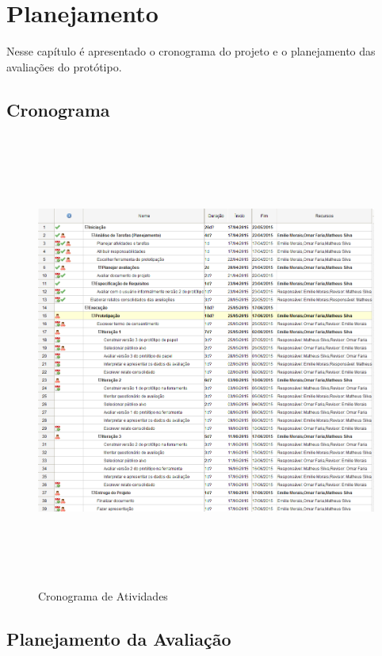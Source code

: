 \chapter{Planejamento}

Nesse capítulo é apresentado o cronograma do projeto e o planejamento das avaliações do protótipo.
\graphicspath{{figuras/}}

\section{Cronograma}
\begin{figure}[!htb]
 \centering
 \includegraphics[width = 17.5cm, height = 15cm]{cronograma.png}
 \caption{Cronograma de Atividades}
 \label{Rotulo}

\end{figure}

\section{Planejamento da Avaliação}


